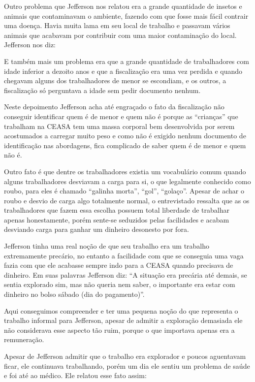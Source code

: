 Outro problema que Jefferson nos relatou era a grande quantidade de insetos e animais que contaminavam o ambiente, fazendo com que fosse mais fácil contrair uma doença. Havia muita lama em seu local de trabalho e passavam vários animais que acabavam por contribuir com uma maior contaminação do local. Jefferson nos diz:

\begin{citacao}
E também mais um problema era que a grande quantidade de trabalhadores com idade inferior a dezoito anos e que a fiscalização era uma vez perdida e quando chegavam alguns dos trabalhadores de menor se escondiam, e os outros, a fiscalização só perguntava a idade sem pedir documento nenhum.
\end{citacao}

Neste depoimento Jefferson acha até engraçado o fato da fiscalização não conseguir identificar quem é de menor e quem não é porque as ``crianças'' que trabalham na CEASA tem uma massa corporal bem desenvolvida por serem acostumados a carregar muito peso e como não é exigido nenhum documento de identificação nas abordagens, fica complicado de saber quem é de menor e quem não é.

Outro fato é que dentre os trabalhadores existia um vocabulário comum quando alguns trabalhadores desviavam a carga para si, o que legalmente conhecido como roubo, para eles é chamado ``galinha morta'', ``gol'', ``golaço''. Apesar de achar o roubo e desvio de carga algo totalmente normal, o entrevistado ressalta que as os trabalhadores que fazem essa escolha possuem total liberdade de trabalhar apenas honestamente, porém sente-se seduzidos pelas facilidades e acabam desviando carga para ganhar um dinheiro desonesto por fora.

Jefferson tinha uma real noção de que seu trabalho era um trabalho extremamente precário, no entanto a facilidade com que se conseguia uma vaga fazia com que ele acabasse sempre indo para a CEASA quando precisava de dinheiro. Em suas palavras Jefferson diz: ``A situação era precária até demais, se sentia explorado sim, mas não queria nem saber, o importante era estar com dinheiro no bolso sábado (dia do pagamento)''. 

Aqui conseguimos compreender e ter uma pequena noção do que representa o trabalho informal para Jefferson, apesar de admitir a exploração demasiada ele não considerava esse aspecto tão ruim, porque o que importava apenas era a remuneração.

Apesar de Jefferson admitir que o trabalho era explorador e poucos aguentavam ficar, ele continuava trabalhando, porém um dia ele sentiu um problema de saúde e foi até ao médico. Ele relatou esse fato assim:

